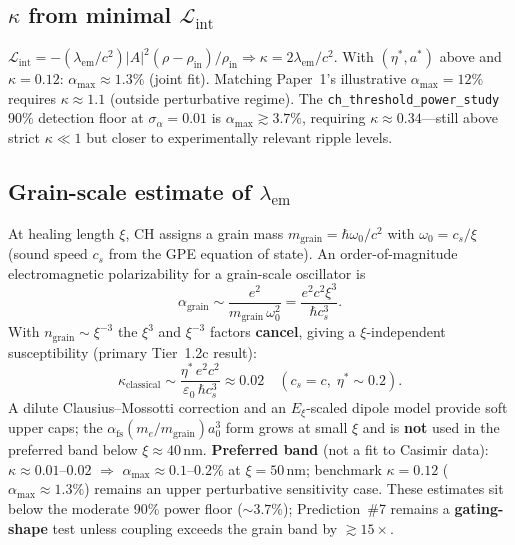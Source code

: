 \documentclass[11pt,a4paper]{article}
\begin{document}
\subsection{\texorpdfstring{$\kappa$}{kappa} from minimal \texorpdfstring{$\mathcal{L}_{\mathrm{int}}$}{L\_int}}

$\mathcal{L}_{\mathrm{int}} = -(\lambda_{\mathrm{em}}/c^2)|A|^2(\rho-\rho_{\mathrm{in}})/\rho_{\mathrm{in}}
\Rightarrow \kappa = 2\lambda_{\mathrm{em}}/c^2$.
With $(\eta^*, a^*)$ above and $\kappa = 0.12$:
$\alpha_{\max} \approx 1.3\%$ (joint fit).
Matching Paper~1's illustrative $\alpha_{\max} = 12\%$ requires $\kappa \approx 1.1$ (outside perturbative regime).
The \texttt{ch\_threshold\_power\_study} 90\% detection floor at $\sigma_\alpha = 0.01$ is $\alpha_{\max} \gtrsim 3.7\%$,
requiring $\kappa \approx 0.34$---still above strict $\kappa \ll 1$ but closer to experimentally relevant ripple levels.

\subsection{Grain-scale estimate of \texorpdfstring{$\lambda_{\mathrm{em}}$}{lambda\_em}}
\label{sec:lambda-em-grain}

At healing length $\xi$, CH assigns a grain mass $m_{\mathrm{grain}} = \hbar\omega_0/c^2$ with
$\omega_0 = c_s/\xi$ (sound speed $c_s$ from the GPE equation of state).
An order-of-magnitude electromagnetic polarizability for a grain-scale oscillator is
\begin{equation}
  \alpha_{\mathrm{grain}} \sim \frac{e^2}{m_{\mathrm{grain}}\,\omega_0^2}
  = \frac{e^2 c^2 \xi^3}{\hbar c_s^3}.
\end{equation}
With $n_{\mathrm{grain}} \sim \xi^{-3}$ the $\xi^3$ and $\xi^{-3}$ factors \textbf{cancel}, giving a
$\xi$-independent susceptibility (primary Tier~1.2c result):
\begin{equation}
  \kappa_{\mathrm{classical}} \sim \frac{\eta^*\,e^2 c^2}{\varepsilon_0\,\hbar c_s^3}
  \approx 0.02\quad (c_s = c,\; \eta^* \sim 0.2).
\end{equation}
A dilute Clausius--Mossotti correction and an $E_\xi$-scaled dipole model provide soft upper caps;
the $\alpha_{\mathrm{fs}}(m_e/m_{\mathrm{grain}})a_0^3$ form grows at small $\xi$ and is \textbf{not}
used in the preferred band below $\xi \approx 40$\,nm.
\textbf{Preferred band} (not a fit to Casimir data): $\kappa \approx 0.01$--$0.02$ $\Rightarrow$
$\alpha_{\max} \approx 0.1$--$0.2\%$ at $\xi = 50$\,nm; benchmark $\kappa = 0.12$ ($\alpha_{\max} \approx 1.3\%$)
remains an upper perturbative sensitivity case.
These estimates sit below the moderate 90\% power floor ($\sim 3.7\%$); Prediction~\#7 remains a
\textbf{gating-shape} test unless coupling exceeds the grain band by $\gtrsim 15\times$.
\end{document}
